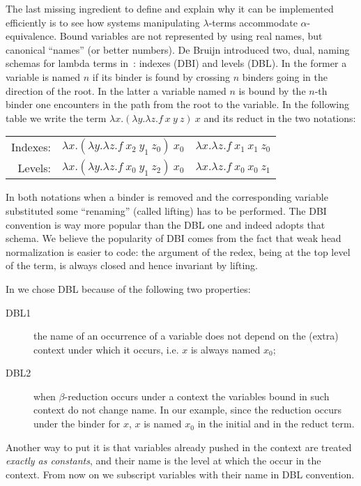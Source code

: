 \documentclass{llncs}
\begin{document}
The last missing ingredient to define \rff{} and explain why it can be
implemented efficiently is to see how systems manipulating $\lambda$-terms
accommodate
$\alpha$-equivalence.  Bound variables are not represented by using
real names, but canonical ``names'' (or better numbers).  De Bruijn introduced
two, dual, naming schemas for lambda terms in~\cite{debruijnlevel}:
indexes (DBI) and levels
(DBL).  In the former a variable is named $n$ if its binder is found by
crossing $n$ binders going in the direction of the root.  In the latter a
variable named $n$ is bound by the $n$-th binder one encounters in the path
from the root to the variable.
In the following table we write the term $\lambda x.(\lambda y.\lambda z.f~x~y~z)~x$ and its reduct in the two notations:
\vspace{-0.8em}
\begin{center}
\begin{tabular}{r@{~~}c@{~$\to_\beta$~}c}
Indexes: & $\lambda x.(\lambda y.\lambda z.f~x_2~y_1~z_0)~x_0$ &
$\lambda x.\lambda z.f~x_1~x_1~z_0$  \\
Levels: & $\lambda x.(\lambda y.\lambda z.f~x_0~y_1~z_2)~x_0$ &
$\lambda x.\lambda z.f~x_0~x_0~z_1$ \\
\end{tabular}
\end{center}
\vspace{-0.2em}
In both notations when a binder is removed and the corresponding variable
substituted some ``renaming'' (called lifting) has to be performed.  
The DBI convention is way more popular than the DBL one and \tedius{}
indeed adopts that schema.  We believe the popularity of DBI comes from the
fact that weak head normalization is easier to code: the argument of the
redex, being at the top level of the term, is always closed and hence
invariant by lifting.

In \elpi{} we chose DBL because of the following two properties:
\begin{description}
\item[DBL1] the name of an occurrence of a variable does not depend on the (extra) context under which it occurs, i.e. $x$ is always named $x_0$;
\item[DBL2]
when $\beta$-reduction occurs under a context the variables bound
in such context do not change name. In our example, since the reduction occurs
under the binder for $x$, $x$ is named $x_0$ in the initial and in the reduct
term.
\end{description}
Another way to put it is that variables already pushed in the context
are treated \emph{exactly as constants}, and their name is the level at
which the occur in the context.  From now on we subscript variables
with their name in DBL convention.
\end{document}
